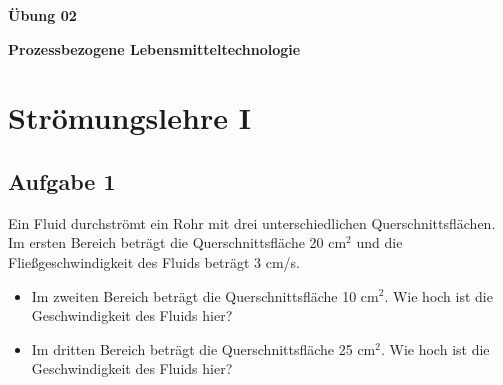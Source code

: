 \documentclass[a4paper,11pt]{article}
\newif\ifshowme
\begin{document}


\bckgrnd


\begin{center}
\LARGE
\color{white}
\textbf{Übung 02} \par \vspace*{2mm}
\large \color{miugray} \textbf{Prozessbezogene Lebensmitteltechnologie}
\end{center}
\par 
\vspace*{6mm}


\color{miudiutex}
\section*{Strömungslehre I}

\subsection*{Aufgabe 1}
Ein Fluid 
durchströmt ein Rohr mit drei unterschiedlichen Querschnittsflächen. 
Im ersten Bereich beträgt die Querschnittsfläche 20 cm$^2$ und die Fließgeschwindigkeit des Fluids beträgt 3 cm/s.
\begin{itemize}
\item Im zweiten Bereich beträgt die Querschnittsfläche 10 cm$^2$. Wie hoch ist die Geschwindigkeit des Fluids hier?
\item Im dritten Bereich beträgt die Querschnittsfläche 25 cm$^2$. Wie hoch ist die Geschwindigkeit des Fluids hier?

\end{itemize}

\ifshowme
\antwort{
Kontinuitätsgleichung
\begin{align*}
A_1 \cdot v_1 = A_2 \cdot v_2 \\
v_2 = \frac{A_1 \cdot v_1}{A_2}
\end{align*}
Einsetzen a) und b):
\begin{align*}
a) &&v_2 &= \frac{20\cm^2 \cdot 3\mskip3mu \cm/\text{s}}{10\mskip3mu \cm^2} &&= 6\cm/\text{s} \\
b) &&v_3 &= \frac{20\cm^2 \cdot 3\mskip3mu \cm/\text{s}}{25\mskip3mu \cm^2} &&=2,4\cm/\text{s}
\end{align*}
}
\pagebreak
\else
\fi
\end{document}
